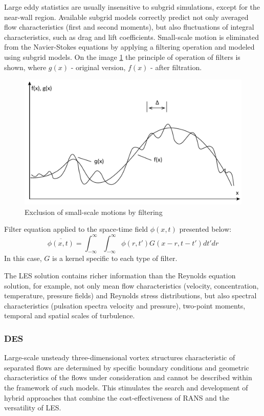	Large eddy statistics are usually insensitive to subgrid simulations, except for the near-wall region. Available subgrid models correctly predict not only averaged flow characteristics (first and second moments), but also fluctuations of integral characteristics, such as drag and lift coefficients\cite{Fureby2000}. Small-scale motion is eliminated from the Navier-Stokes equations by applying a filtering operation and modeled using subgrid models. On the image \ref{fig:lesfilter} the principle of operation of filters is shown, where $g(x)$ - original version, $f(x)$ - after filtration.\\
	\begin{figure}[H]
		\centering
		\includegraphics[width=0.7\linewidth]{../Assets/ФильтрацияLES}
		\caption{Exclusion of small-scale motions by filtering}
		\label{fig:lesfilter}
	\end{figure}

	Filter equation applied to the space-time field $\phi(x,t)$ presented below:
	\begin{equation}
		\overline{\phi(x,t)} = \int_{-\infty}^{\infty}\int_{-\infty}^{\infty}\phi(r,t')G(x - r, t - t')dt'dr
	\end{equation}
	In this case, $G$ is a kernel specific to each type of filter.
	
	The LES solution contains richer information than the Reynolds equation solution, for example, not only mean flow characteristics (velocity, concentration, temperature, pressure fields) and Reynolds stress distributions, but also spectral characteristics (pulsation spectra velocity and pressure), two-point moments, temporal and spatial scales of turbulence.
	
\subsubsection{DES}
	Large-scale unsteady three-dimensional vortex structures characteristic of separated flows are determined by specific boundary conditions and geometric characteristics of the flows under consideration and cannot be described within the framework of such models. This stimulates the search and development of hybrid approaches that combine the cost-effectiveness of RANS and the versatility of LES.
	
